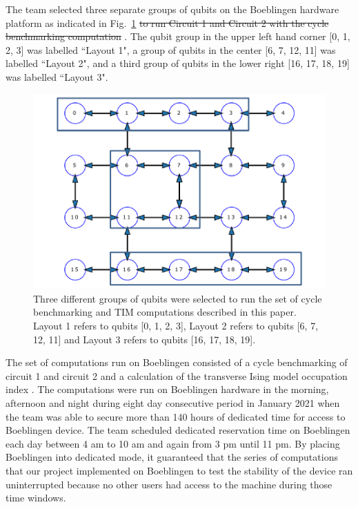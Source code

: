 The team  selected three separate groups of qubits on the Boeblingen hardware platform as indicated in Fig.~\ref{fig:Boeblingenlayout} \sout{to run Circuit 1 and Circuit 2 with the cycle benchmarking computation} .  The qubit group in the upper left hand corner [0, 1, 2, 3] was labelled ``Layout 1", a group of qubits in the center [6, 7, 12, 11] was labelled ``Layout 2", and a third group of qubits in the lower right [16, 17, 18, 19] was labelled ``Layout 3".  

\begin{figure}[htpb]
    \centering
    \includegraphics[scale=0.4]{QubitLayoutBoeblingen.pdf}
    \caption{Three different groups of qubits were selected to run the set of cycle benchmarking and TIM computations described in this paper.  Layout 1 refers to qubits [0, 1, 2, 3], Layout 2 refers to qubits [6, 7, 12, 11] and Layout 3 refers to qubits [16, 17, 18, 19]. }
    \label{fig:Boeblingenlayout}
\end{figure}

The set of computations run on Boeblingen consisted of a cycle benchmarking of  circuit 1 and circuit 2  and a calculation of the transverse Ising model occupation index .  The computations were run on Boeblingen hardware in the morning, afternoon and night during eight day consecutive period in January 2021 when the team was able to secure more than 140 hours of dedicated time for access to Boeblingen device.  The team scheduled dedicated reservation time on Boeblingen each day between 4 am to 10 am and again from 3 pm until 11 pm.  By placing Boeblingen into dedicated mode, it guaranteed that the series of computations that our project implemented on Boeblingen to test the stability of the device ran uninterrupted because no other users had access to the machine during those time windows.  

